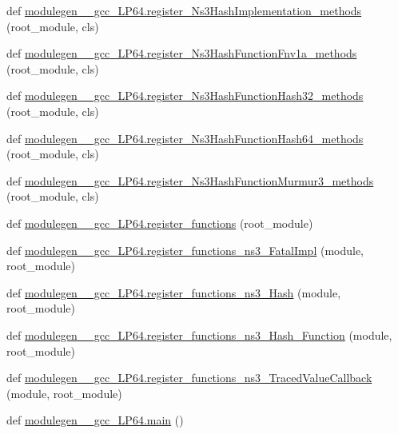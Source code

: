 \begin{DoxyCompactItemize}
\item 
def \hyperlink{namespacemodulegen____gcc__LP64_afdc62559dc296b925757fa93e7cd4260}{modulegen\+\_\+\+\_\+gcc\+\_\+\+L\+P64.\+register\+\_\+\+Ns3\+Hash\+Implementation\+\_\+methods} (root\+\_\+module, cls)
\item 
def \hyperlink{namespacemodulegen____gcc__LP64_ae9b88db2dea3c59f886d0be14d039694}{modulegen\+\_\+\+\_\+gcc\+\_\+\+L\+P64.\+register\+\_\+\+Ns3\+Hash\+Function\+Fnv1a\+\_\+methods} (root\+\_\+module, cls)
\item 
def \hyperlink{namespacemodulegen____gcc__LP64_a9e34b1934e0920db80354937fe083ff8}{modulegen\+\_\+\+\_\+gcc\+\_\+\+L\+P64.\+register\+\_\+\+Ns3\+Hash\+Function\+Hash32\+\_\+methods} (root\+\_\+module, cls)
\item 
def \hyperlink{namespacemodulegen____gcc__LP64_a082871bd62d0a4db1581a4a5a90ef0ac}{modulegen\+\_\+\+\_\+gcc\+\_\+\+L\+P64.\+register\+\_\+\+Ns3\+Hash\+Function\+Hash64\+\_\+methods} (root\+\_\+module, cls)
\item 
def \hyperlink{namespacemodulegen____gcc__LP64_adca5cdfc5ab708e8c329dbbc45251f75}{modulegen\+\_\+\+\_\+gcc\+\_\+\+L\+P64.\+register\+\_\+\+Ns3\+Hash\+Function\+Murmur3\+\_\+methods} (root\+\_\+module, cls)
\item 
def \hyperlink{namespacemodulegen____gcc__LP64_aec4a5f753ed5fb80e971fb72341c9052}{modulegen\+\_\+\+\_\+gcc\+\_\+\+L\+P64.\+register\+\_\+functions} (root\+\_\+module)
\item 
def \hyperlink{namespacemodulegen____gcc__LP64_a50e31627c725d62dd753bad9b750a7a2}{modulegen\+\_\+\+\_\+gcc\+\_\+\+L\+P64.\+register\+\_\+functions\+\_\+ns3\+\_\+\+Fatal\+Impl} (module, root\+\_\+module)
\item 
def \hyperlink{namespacemodulegen____gcc__LP64_aaccaa7a88652c7cf1cbe4bae23dfd70f}{modulegen\+\_\+\+\_\+gcc\+\_\+\+L\+P64.\+register\+\_\+functions\+\_\+ns3\+\_\+\+Hash} (module, root\+\_\+module)
\item 
def \hyperlink{namespacemodulegen____gcc__LP64_ac5702d84dcfdab4237af2580ad57e6cd}{modulegen\+\_\+\+\_\+gcc\+\_\+\+L\+P64.\+register\+\_\+functions\+\_\+ns3\+\_\+\+Hash\+\_\+\+Function} (module, root\+\_\+module)
\item 
def \hyperlink{namespacemodulegen____gcc__LP64_a598936972a1d732adf3c766e058929eb}{modulegen\+\_\+\+\_\+gcc\+\_\+\+L\+P64.\+register\+\_\+functions\+\_\+ns3\+\_\+\+Traced\+Value\+Callback} (module, root\+\_\+module)
\item 
def \hyperlink{namespacemodulegen____gcc__LP64_a78c8b268d5fecc4d52d220f8954d0345}{modulegen\+\_\+\+\_\+gcc\+\_\+\+L\+P64.\+main} ()
\end{DoxyCompactItemize}
